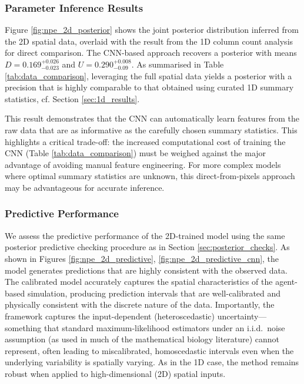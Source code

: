 \documentclass{article}
\begin{document}
\subsubsection{Parameter Inference Results}
Figure \ref{fig:npe_2d_posterior} shows the joint posterior distribution inferred from the 2D spatial data, overlaid with the result from the 1D column count analysis for direct comparison. The CNN-based approach recovers a posterior with means $D = 0.169^{+0.026}_{-0.023}$
 and $U = 0.290^{+0.008}_{-0.09}$. As summarised in Table \ref{tab:data_comparison}, leveraging the full spatial data yields a posterior with a precision that is highly comparable to that obtained using curated 1D summary statistics, cf. Section \ref{sec:1d_results}.

This result demonstrates that the CNN can automatically learn features from the raw data that are as informative as the carefully chosen summary statistics. This highlights a critical trade-off: the increased computational cost of training the CNN (Table \ref{tab:data_comparison}) must be weighed against the major advantage of avoiding manual feature engineering. For more complex models where optimal summary statistics are unknown, this direct-from-pixels approach may be advantageous for accurate inference.

\subsubsection{Predictive Performance}
We assess the predictive performance of the 2D-trained model using the same posterior predictive checking procedure as in Section \ref{sec:posterior_checks}. As shown in Figures \ref{fig:npe_2d_predictive}, \ref{fig:npe_2d_predictive_cnn}, the model generates predictions that are highly consistent with the observed data. The calibrated model accurately captures the spatial characteristics of the agent-based simulation, producing prediction intervals that are well-calibrated and physically consistent with the discrete nature of the data. Importantly, the framework captures the input-dependent (heteroscedastic) uncertainty—something that standard maximum-likelihood estimators under an i.i.d.\ noise assumption (as used in much of the mathematical biology literature) cannot represent, often leading to miscalibrated, homoscedastic intervals even when the underlying variability is spatially varying. As in the 1D case, the method remains robust when applied to high-dimensional (2D) spatial inputs.
\end{document}
